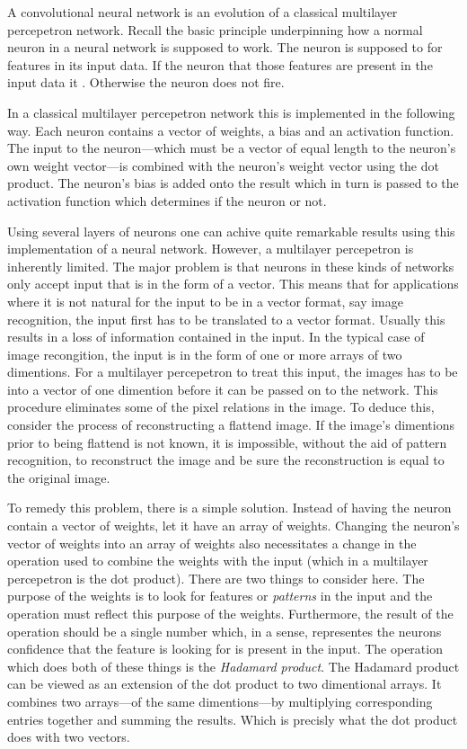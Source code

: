 \startsection[title={\em Convolutional} Neural Networks]
A convolutional neural network is an evolution of a classical multilayer percepetron network.
Recall the basic principle underpinning how a normal neuron in a neural network is supposed to work.
The neuron is supposed to  for features in its input data.
If the neuron  that those features are present in the input data it .
Otherwise the neuron does not fire.

In a classical multilayer percepetron network this is implemented in the following way.
Each neuron contains a vector of weights, a bias and an activation function.
The input to the neuron---which must be a vector of equal length to the neuron's own weight vector---is combined with the neuron's weight vector using the dot product.
The neuron's bias is added onto the result which in turn is passed to the activation function which determines if the neuron  or not.

Using several layers of neurons one can achive quite remarkable results using this implementation of a neural network.
However, a multilayer percepetron is inherently limited.
The major problem is that neurons in these kinds of networks only accept input that is in the form of a vector.
This means that for applications where it is not natural for the input to be in a vector format, say image recognition, the input first has to be translated to a vector format.
Usually this results in a loss of information contained in the input.
In the typical case of image recongition, the input is in the form of one or more arrays of two dimentions.
For a multilayer percepetron to treat this input, the images has to be  into a vector of one dimention before it can be passed on to the network.
This procedure eliminates some of the pixel relations in the image.
To deduce this, consider the process of reconstructing a flattend image.
If the image's dimentions prior to being flattend is not known, it is impossible, without the aid of pattern recognition, to reconstruct the image and be sure the reconstruction is equal to the original image.

To remedy this problem, there is a simple solution.
Instead of having the neuron contain a vector of weights, let it have an array of weights.
Changing the neuron's vector of weights into an array of weights also necessitates a change in the operation used to combine the weights with the input (which in a multilayer percepetron is the dot product).
There are two things to consider here.
The purpose of the weights is to look for features or {\em patterns} in the input and the operation must reflect this purpose of the weights.
Furthermore, the result of the operation should be a single number which, in a sense, representes the neurons  confidence that the feature is looking for is present in the input.
The operation which does both of these things is the {\em Hadamard product}.
The Hadamard product can be viewed as an extension of the dot product to two dimentional arrays.
It combines two arrays---of the same dimentions---by multiplying corresponding entries together and summing the results.
Which is precisly what the dot product does with two vectors.

